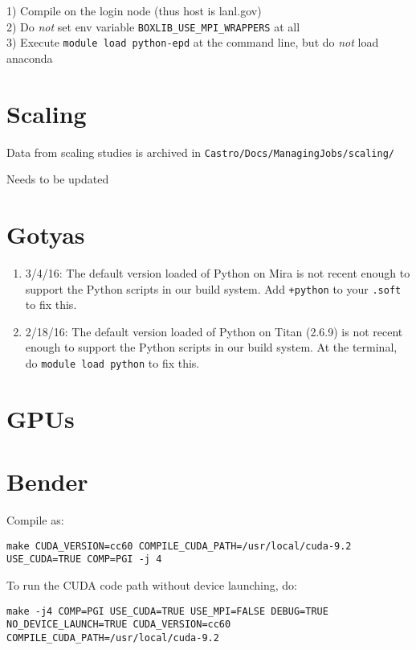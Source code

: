 1) Compile on the login node (thus host is lanl.gov)\\
2) Do \textit{not} set env variable \texttt{BOXLIB\_USE\_MPI\_WRAPPERS} at all\\
3) Execute \texttt{module load python-epd} at the command line, but do \textit{not} load anaconda\\


\section{Scaling}

Data from scaling studies is archived in {\tt Castro/Docs/ManagingJobs/scaling/}

Needs to be updated



\section{Gotyas}

\begin{enumerate}

\item 3/4/16: The default version loaded of Python on Mira is not
  recent enough to support the Python scripts in our build system. Add
  {\tt +python} to your {\tt .soft} to fix this.

\item 2/18/16: The default version loaded of Python on Titan (2.6.9)
  is not recent enough to support the Python scripts in our build
  system. At the terminal, do {\tt module load python} to fix this.


\end{enumerate}



\section{GPUs}

\section{Bender}
Compile as:
\begin{verbatim}
make CUDA_VERSION=cc60 COMPILE_CUDA_PATH=/usr/local/cuda-9.2 USE_CUDA=TRUE COMP=PGI -j 4
\end{verbatim}

To run the CUDA code path without device launching, do:
\begin{verbatim}
make -j4 COMP=PGI USE_CUDA=TRUE USE_MPI=FALSE DEBUG=TRUE NO_DEVICE_LAUNCH=TRUE CUDA_VERSION=cc60 COMPILE_CUDA_PATH=/usr/local/cuda-9.2
\end{verbatim}

